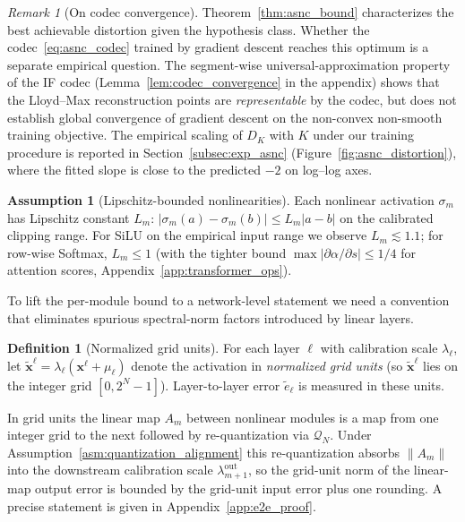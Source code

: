 \documentclass{article}
\theoremstyle{plain}
\theoremstyle{definition}
\newtheorem{definition}[theorem]{Definition}
\newtheorem{assumption}[theorem]{Assumption}
\theoremstyle{remark}
\newtheorem{remark}[theorem]{Remark}
\begin{document}
\begin{remark}[On codec convergence]
\label{rem:lloyd_max}
Theorem~\ref{thm:asnc_bound} characterizes the best achievable distortion
given the hypothesis class. Whether the codec~\eqref{eq:asnc_codec} trained
by gradient descent reaches this optimum is a separate empirical question.
The segment-wise universal-approximation property of the IF codec
(Lemma~\ref{lem:codec_convergence} in the appendix) shows that the
Lloyd--Max reconstruction points are \emph{representable} by the codec, but
does not establish global convergence of gradient descent on the non-convex
non-smooth training objective. The empirical scaling of $D_K$ with $K$
under our training procedure is reported in
Section~\ref{subsec:exp_asnc} (Figure~\ref{fig:asnc_distortion}), where the
fitted slope is close to the predicted $-2$ on log--log axes.
\end{remark}

\begin{assumption}[Lipschitz-bounded nonlinearities]
\label{asm:lipschitz}
Each nonlinear activation $\sigma_m$ has Lipschitz constant $L_m$:
$|\sigma_m(a)-\sigma_m(b)|\le L_m|a-b|$ on the calibrated clipping range.
For SiLU on the empirical input range we observe $L_m\lesssim 1.1$; for
row-wise Softmax, $L_m\le 1$ (with the tighter bound
$\max|\partial\alpha/\partial s|\le 1/4$ for attention scores,
Appendix~\ref{app:transformer_ops}).
\end{assumption}

To lift the per-module bound to a network-level statement we need a
convention that eliminates spurious spectral-norm factors introduced by
linear layers.

\begin{definition}[Normalized grid units]
\label{def:grid_units}
For each layer $\ell$ with calibration scale $\lambda_\ell$, let
$\tilde{\mathbf{x}}^\ell=\lambda_\ell(\mathbf{x}^\ell+\mu_\ell)$ denote the
activation in \emph{normalized grid units} (so $\tilde{\mathbf{x}}^\ell$
lies on the integer grid $[0,2^N-1]$). Layer-to-layer error
$\tilde{e}_\ell$ is measured in these units.
\end{definition}

In grid units the linear map $A_m$ between nonlinear modules is a map from
one integer grid to the next followed by re-quantization via $\mathcal{Q}_N$.
Under Assumption~\ref{asm:quantization_alignment} this re-quantization
absorbs $\|A_m\|$ into the downstream calibration scale
$\lambda_{m+1}^{\mathrm{out}}$, so the grid-unit norm of the linear-map
output error is bounded by the grid-unit input error plus one rounding. A
precise statement is given in Appendix~\ref{app:e2e_proof}.
\end{document}
